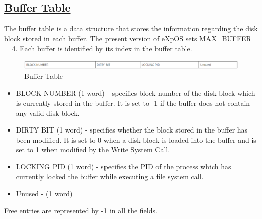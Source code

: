\subsection{\href{http://exposnitc.github.io/os_design-files/mem_ds.html#buffer_table}{Buffer Table}}
The buffer table is a data structure that stores the information regarding the disk block stored in each buffer. The present version of eXpOS sets MAX\_BUFFER = 4. Each buffer is identified by its index in the buffer table.
\begin{figure}[ht]
\centering
\includegraphics  [scale=0.55]{figures/bt.png}
\caption{\footnotesize Buffer Table}
\end{figure}
\begin {itemize}
\item BLOCK NUMBER (1 word) - specifies block number of the disk block which is currently stored in the buffer. It is set to -1 if the buffer does not contain any valid disk block.
\item DIRTY BIT (1 word) - specifies whether the block stored in the buffer has been modified. It is set to 0 when a disk block is loaded into the buffer and is set to 1 when modified by the Write System Call.
\item LOCKING PID (1 word) - specifies the PID of the process which has currently locked the buffer while executing a file system call.
\item Unused - (1 word)
\end {itemize}

Free entries are represented by -1 in all the fields.

